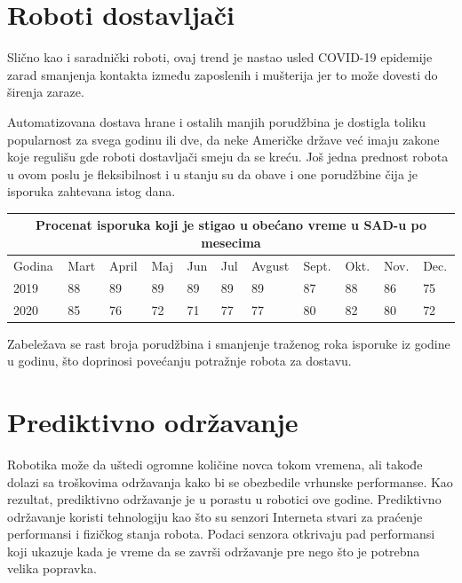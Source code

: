\documentclass{report}
\begin{document}
	\chapter{Roboti dostavljači}
	Slično kao i saradnički roboti, ovaj trend je nastao usled COVID-19 epidemije zarad smanjenja kontakta između zaposlenih i mušterija jer to može dovesti do širenja zaraze.
	
	Automatizovana dostava hrane i ostalih manjih porudžbina je dostigla toliku popularnost za svega godinu ili dve, da neke Američke države već imaju zakone koje regulišu gde roboti dostavljači smeju da se kreću. Još jedna prednost robota u ovom poslu je fleksibilnost i u stanju su da obave i one porudžbine čija je isporuka zahtevana istog dana.
	\vspace{0.25cm}
	\begin{center}
		\begin{tabular}{ |p{1cm}|p{1cm}|p{1cm}|p{1cm} |p{1cm}|p{1cm}|p{1cm}|p{1cm}|p{1cm}|p{1cm}|p{1cm}|}
			\hline
			\multicolumn{11}{|c|}{Procenat isporuka koji je stigao u obećano vreme u SAD-u po mesecima} \\
			\hline
			Godina & Mart & April & Maj & Jun & Jul & Avgust & Sept. & Okt. & Nov. & Dec. \\
			\hline
			2019 & 88 & 89 & 89 & 89 & 89 & 89 & 87 & 88 & 86 & 75 \\
			2020 & 85 & 76 & 72 & 71 & 77 & 77 & 80 & 82 & 80 & 72 \\
			\hline
		\end{tabular}
	\end{center}
	\vspace{0.25cm}
	Zabeležava se rast broja porudžbina i smanjenje traženog roka isporuke iz godine u godinu, što doprinosi povećanju potražnje robota za dostavu. \cite{robotics2022, sameday}  
	
	\chapter{Prediktivno održavanje}
	Robotika može da uštedi ogromne količine novca tokom vremena, ali takođe dolazi sa troškovima održavanja kako bi se obezbedile vrhunske performanse. Kao rezultat, prediktivno održavanje je u porastu u robotici ove godine. Prediktivno održavanje koristi tehnologiju kao što su senzori Interneta stvari za praćenje performansi i fizičkog stanja robota. Podaci senzora otkrivaju pad performansi koji ukazuje kada je vreme da se završi održavanje pre nego što je potrebna velika popravka.
	
\end{document}
